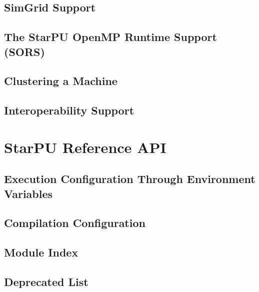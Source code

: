 \chapter{SimGrid Support}
\label{SimGridSupport}
\hypertarget{SimGridSupport}{}


\chapter{The StarPU OpenMP Runtime Support (SORS)}
\label{OpenMPRuntimeSupport}
\hypertarget{OpenMPRuntimeSupport}{}


\chapter{Clustering a Machine}
\label{ClusteringAMachine}
\hypertarget{ClusteringAMachine}{}


\chapter{Interoperability Support}
\label{InteropSupport}
\hypertarget{InteropSupport}{}


\part{StarPU Reference API}

\chapter{Execution Configuration Through Environment Variables}
\label{ExecutionConfigurationThroughEnvironmentVariables}
\hypertarget{ExecutionConfigurationThroughEnvironmentVariables}{}


\chapter{Compilation Configuration}
\label{CompilationConfiguration}
\hypertarget{CompilationConfiguration}{}


\chapter{Module Index}


\chapter{Deprecated List}


